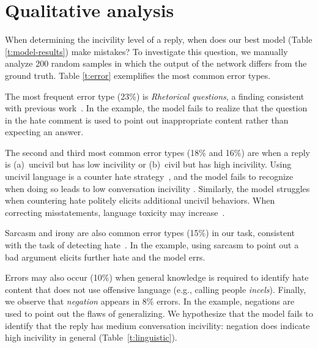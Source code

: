 \documentclass[11pt]{article}
\begin{document}
	
	\section{Qualitative analysis}
	\label{s:erroranalysis}
	
	When determining the incivility level of a reply,
	when does our best model (Table \ref{t:model-results}) make mistakes? 
	To investigate this question,
	we manually analyze 200 random samples in which the output of the network differs from the ground truth. 
	Table \ref{t:error} exemplifies the most common error types.
	
	The most frequent error type (23\%) is \emph{Rhetorical questions},
	a finding consistent with previous work~\cite{schmidt-wiegand-2017-survey}. 
	In the example,
	the model fails to realize that the question in the hate comment is used to point out inappropriate content rather than expecting an answer.
	
	The second and third most common error types (18\% and 16\%)
	are when a reply is
	(a)~uncivil but has low incivility
	or
	(b)~civil but has high incivility.
	Using uncivil language is a counter hate strategy~\cite{DBLP:conf/icwsm/MathewSTRSMG019},
	and the model fails to recognize when doing so leads to low conversation incivility .
	Similarly, the model struggles when countering hate politely elicits additional uncivil behaviors.
	When correcting misstatements, language toxicity may increase~\cite{10.1145/3411764.3445642}.
	
	
	Sarcasm and irony are also common error types (15\%) in our task,
	consistent with the task of detecting hate~\cite{nobata2016abusive,qian-etal-2019-benchmark}.
	In the example, using sarcasm to point out a bad argument elicits further hate and the model errs.
	
	Errors may also occur (10\%) when general knowledge is required to identify hate content that does not use offensive language (e.g., calling people \emph{incels}).
	Finally, we observe that \emph{negation} appears in 8\% errors.
	In the example, negations are used to point out the flaws of generalizing.
	We hypothesize that the model fails to identify that the reply has medium conversation incivility: negation does indicate high incivility in general (Table~\ref{t:linguistic}).
	
	
\end{document}
